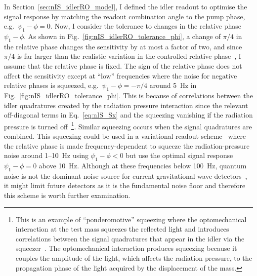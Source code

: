 In Section~\ref{sec:nIS_idlerRO_model}, I defined the idler readout to optimise the signal response by matching the readout combination angle to the pump phase, e.g.\ $\psi_1-\phi=0$. Now, I consider the tolerance to changes in the relative phase $\psi_1-\phi$. %
As shown in Fig.~\ref{fig:nIS_idlerRO_tolerance_phi}, a change of $\pi/4$ in the relative phase changes the sensitivity by at most a factor of two, and since $\pi/4$ is far larger than the realistic variation in the controlled relative phase~\cite{Yap:19}, I assume that the relative phase is fixed. %
The sign of the relative phase does not affect the sensitivity except at ``low'' frequencies where the noise for negative relative phases is squeezed, e.g.\ $\psi_1-\phi=-\pi/4$ around 5~Hz in Fig.~\ref{fig:nIS_idlerRO_tolerance_phi}. This is because of correlations between the idler quadratures created by the radiation pressure interaction since the relevant off-diagonal terms in Eq.~\ref{eq:nIS_Sx} and the squeezing vanishing if the radiation pressure is turned off~\footnote{This is an example of ``ponderomotive'' squeezing where the optomechanical interaction at the test mass squeezes the reflected light and introduces correlations between the signal quadratures that appear in the idler via the squeezer~\cite{kimble_2001}. The optomechanical interaction produces squeezing because it couples the amplitude of the light, which affects the radiation pressure, to the propagation phase of the light acquired by the displacement of the mass.}. Similar squeezing occurs when the signal quadratures are combined.
This squeezing could be used in a variational readout scheme~\cite{zhangBroadbandSignalRecycling2021} where the relative phase is made frequency-dependent to squeeze the radiation-pressure noise around 1--10~Hz using $\psi_1-\phi<0$ but use the optimal signal response $\psi_1-\phi=0$ above 10~Hz. Although at these frequencies below 100~Hz, quantum noise is not the dominant noise source for current gravitational-wave detectors~\cite{buikemaSensitivityPerformanceAdvanced2020}, it might limit future detectors as it is the fundamental noise floor and therefore this scheme is worth further examination.
